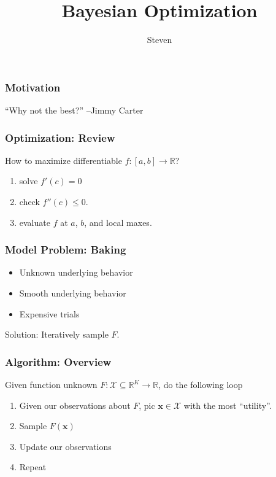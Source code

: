 \documentclass{beamer}
\title{Bayesian Optimization}
\author{Steven}
\begin{document}
\begin{frame}
    \titlepage
\end{frame}

\begin{frame}
    \frametitle{Motivation}
    \begin{centering}
        ``Why not the best?'' --Jimmy Carter
    \end{centering}
\end{frame}

\begin{frame}
    \frametitle{Optimization: Review}
    How to maximize differentiable $f:[a, b] \to \mathbb{R}$?
    \begin{enumerate}
        \item solve $f'(c) = 0$
            \pause
        \item check $f''(c) \leq 0$.
            \pause
        \item evaluate $f$ at $a$, $b$, and local maxes.
    \end{enumerate}
\end{frame}

\begin{frame}
    \frametitle{Model Problem: Baking}
    \begin{itemize}
        \item Unknown underlying behavior
            \pause
        \item Smooth underlying behavior
            \pause
        \item Expensive trials
            \pause
    \end{itemize}
    Solution: Iteratively sample $F$.
\end{frame}

\begin{frame}
    \frametitle{Algorithm: Overview}
    Given function unknown $F: \mathcal{X} \subseteq \mathbb{R}^{K} \to \mathbb{R}$, do the following loop
    \begin{enumerate}
        \item Given our observations about $F$, pic $\mathbf{x} \in \mathcal{X}$ with the most ``utility''.
            \pause
        \item Sample $F(\mathbf{x})$
            \pause
        \item Update our observations
            \pause
        \item Repeat
    \end{enumerate}
\end{frame}
\end{document}
